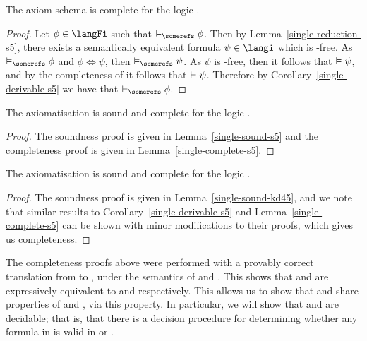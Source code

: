\begin{lemma}\label{single-complete-s5}
The axiom schema \axiomSiF{} is complete for the logic \logicSiF{}.
\end{lemma}

\begin{proof}
Let $\phi \in \langFi$ such that $\entails_\somerefs \phi$. Then by
Lemma~\ref{single-reduction-s5}, there exists a semantically equivalent formula
$\psi \in \langi$ which is \somerefs-free. As $\entails_\somerefs \phi$ and
$\phi \iff \psi$, then $\entails_\somerefs \psi$. As $\psi$ is
\somerefs-free, then it follows that $\vDash \psi$, and by the
completeness of \axiomSiF{} it follows that $\vdash \psi$.
Therefore by Corollary~\ref{single-derivable-s5} we have that $\proves_\somerefs
\phi$.
\end{proof}

\begin{theorem}
The axiomatisation \axiomSiF{} is sound and complete for the logic \logicSiF{}.
\end{theorem}

\begin{proof}
The soundness proof is given in Lemma~\ref{single-sound-s5} and the completeness
proof is given in Lemma~\ref{single-complete-s5}.
\end{proof}

\begin{theorem}
The axiomatisation \axiomKDiF{} is sound and complete for the logic \logicKDiF{}.
\end{theorem}

\begin{proof}
The soundness proof is given in Lemma~\ref{single-sound-kd45}, and we note that
similar results to Corollary~\ref{single-derivable-s5} and
Lemma~\ref{single-complete-s5} can be shown with minor modifications to their
proofs, which gives us completeness.
\end{proof}

The completeness proofs above were performed with a provably correct translation
from \langFi{} to \langi{}, under the semantics of \logicSiF{} and \logicKDiF{}.
This shows that \logicSiF{} and \logicKDiF{} are expressively equivalent to
\logicSi{} and \logicKDi{} respectively. This allows us to show that \logicSiF{}
and \logicKDiF{} share properties of \logicSi{} and \logicKDi{}, via this
property. In particular, we will show that \logicSiF{} and \logicKDiF{} are
decidable; that is, that there is a decision procedure for determining whether
any formula in \langFi{} is valid in \logicSiF{} or \logicKDiF{}.

